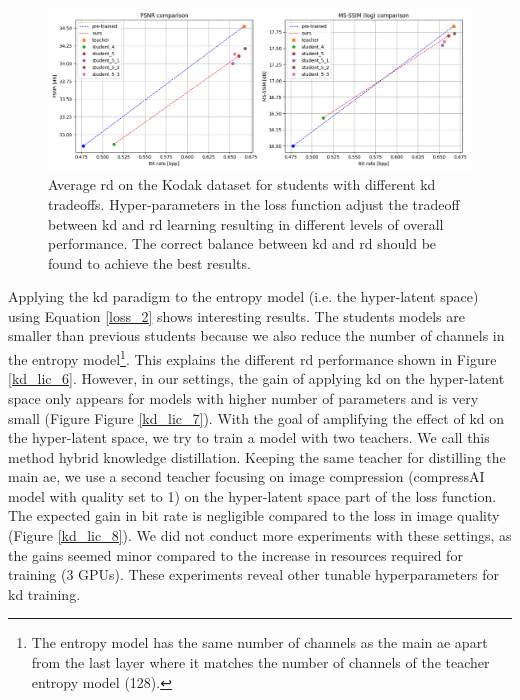 \documentclass{article}
\begin{document}
\begin{figure}
    \centering
    \includegraphics[width=15cm]{kd_lic_param_lambda_1.png}
    \caption[Average \acrshort{rd} on the Kodak dataset for students with different \acrshort{kd} tradeoffs.]{Average \acrshort{rd} on the Kodak dataset for students with different \acrshort{kd} tradeoffs. Hyper-parameters in the loss function adjust the tradeoff between \acrshort{kd} and \acrshort{rd} learning resulting in different levels of overall performance. The correct balance between \acrshort{kd} and \acrshort{rd} should be found to achieve the best results.}
    \label{kd_lic_5}
\end{figure}

Applying the \acrshort{kd} paradigm to the entropy model (i.e. the hyper-latent space) using Equation \ref{loss_2} shows interesting results. The students models are smaller than previous students because we also reduce the number of channels in the entropy model\footnote{The entropy model has the same number of channels as the main \acrshort{ae} apart from the last layer where it matches the number of channels of the teacher entropy model (128).}. This explains the different \acrshort{rd} performance shown in Figure \ref{kd_lic_6}. However, in our settings, the gain of applying \acrshort{kd} on the hyper-latent space only appears for models with higher number of parameters and is very small (Figure Figure \ref{kd_lic_7}). With the goal of amplifying the effect of \acrshort{kd} on the hyper-latent space, we try to train a model with two teachers. We call this method hybrid knowledge distillation. Keeping the same teacher for distilling the main \acrshort{ae}, we use a second teacher focusing on image compression (compressAI model with \textsf{quality} set to 1) on the hyper-latent space part of the loss function. The expected gain in bit rate is negligible compared to the loss in image quality (Figure \ref{kd_lic_8}). We did not conduct more experiments with these settings, as the gains seemed minor compared to the increase in resources required for training (3 GPUs). These experiments reveal other tunable hyperparameters for \acrshort{kd} training.
\end{document}
